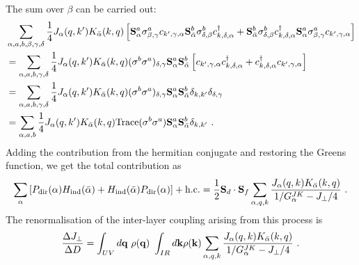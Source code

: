 \documentclass[%
reprint,
superscriptaddress,
groupedaddress,
superscriptaddress,
onecolumn,
10pt
]{revtex4-2}
\begin{document}
The sum over \(\beta\) can be carried out:
\begin{equation}\begin{aligned}
	& \sum_{\alpha, a, b, \beta, \gamma, \delta}\frac{1}{4}J_\alpha(q, k^\prime) K_{\bar\alpha}(k, q) \left[{\bf S}^a_\alpha \sigma^a_{\beta,\gamma} c_{k^\prime,\gamma,\alpha} {\bf S}^b_{\bar\alpha}\sigma^b_{\delta, \beta} c^\dagger_{k,\delta,\alpha} + {\bf S}^b_{\bar\alpha}\sigma^b_{\delta, \beta} c^\dagger_{k,\delta,\alpha}{\bf S}^a_\alpha \sigma^a_{\beta,\gamma} c_{k^\prime,\gamma,\alpha} \right] \\
	&=\sum_{\alpha, a, b, \gamma, \delta}\frac{1}{4}J_\alpha(q, k^\prime) K_{\bar\alpha}(k, q) (\sigma^b \sigma^a)_{\delta,\gamma}{\bf S}^a_\alpha {\bf S}^b_{\bar\alpha} \left[ c_{k^\prime,\gamma,\alpha} c^\dagger_{k,\delta,\alpha} + c^\dagger_{k,\delta,\alpha} c_{k^\prime,\gamma,\alpha} \right]\\
																														 &=\sum_{\alpha, a, b, \gamma, \delta}\frac{1}{4}J_\alpha(q, k^\prime) K_{\bar\alpha}(k, q) (\sigma^b \sigma^a)_{\delta,\gamma}{\bf S}^a_\alpha {\bf S}^b_{\bar\alpha} \delta_{k,k^\prime}\delta_{\delta,\gamma}\\
																														 &=\sum_{\alpha, a, b}\frac{1}{4}J_\alpha(q, k^\prime) K_{\bar\alpha}(k, q) \text{Trace}(\sigma^b \sigma^a){\bf S}^a_\alpha {\bf S}^b_{\bar\alpha} \delta_{k,k^\prime}~.
\end{aligned}\end{equation}
Adding the contribution from the hermitian conjugate and restoring the Greens function, we get the total contribution as
\begin{equation}\begin{aligned}
	\sum_\alpha \left[P_\text{dir}(\alpha)H_\text{ind}(\bar\alpha) + H_\text{ind}(\bar\alpha)P_\text{dir}(\alpha)\right] + \text{h.c.} = \frac{1}{2}{\bf S}_d \cdot {\bf S}_{f} \sum_{\alpha,q,k} \frac{J_\alpha(q, k)K_{\bar\alpha}(k, q)}{1/G_\alpha^{JK} - J_\perp / 4} ~.
\end{aligned}\end{equation}
The renormalisation of the inter-layer coupling arising from this process is
\begin{equation}\begin{aligned}\label{interRenormalisation}
	\frac{\Delta J_\perp}{\Delta D} = \int_{UV} d{\bf q} ~\rho({\bf q})~\int_{IR} d{\bf k} \rho({\bf k}) \sum_{\alpha,q,k} \frac{J_\alpha(q, k)K_{\bar\alpha}(k, q)}{1/G_\alpha^{JK} - J_\perp / 4}~.
\end{aligned}\end{equation}
\end{document}
